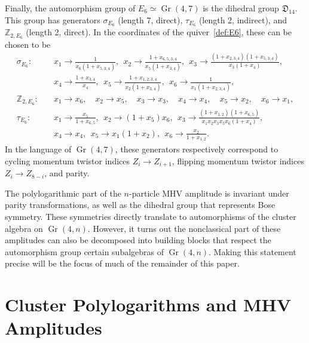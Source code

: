 \documentclass[11pt]{article}
\DeclareMathOperator{\Gr}{Gr}
\begin{document}
Finally, the automorphism group of $E_6 \simeq \Gr(4,7)$ is the dihedral group ${\mathfrak D}_{14}$. This group has generators $\sigma_{E_6}$ (length 7, direct), $\tau_{E_6}$ (length 2, indirect), and $\mathbb{Z}_{2,E_6}$ (length 2, direct). In the coordinates of the quiver~\eqref{def:E6}, these can be chosen to be 
\begin{equation}
\begin{split}
  \sigma_{E_6}:\quad& 
    x_1\to \frac{1}{x_6 (1+x_{5,3,4})},~~
    x_2\to \frac{1+x_{6,5,3,4}}{x_5 (1+x_{3,4})},~~
    x_3\to \frac{(1+x_{2,3,4}) (1+x_{5,3,4})}{x_3 (1+x_4)},\\&
    x_4\to \frac{1+x_{3,4}}{x_4},~~
    x_5\to \frac{1+x_{1,2,3,4}}{x_2 (1+x_{3,4})},~~
    x_6\to \frac{1}{x_1 (1+x_{2,3,4})},\\[2ex]
  \mathbb{Z}_{2,E_6}:\quad& 
    x_1\to x_6, \quad x_2\to x_5, \quad x_3 \to x_3, \quad x_4 \to x_4, \quad x_5\to x_2, \quad x_6\to x_1, \\[2ex]
  \tau_{E_6}:\quad& 
    x_1\to \frac{x_5}{1+x_{6,5}},~~
    x_2\to (1+x_5) x_6,~~
    x_3\to \frac{(1+x_{1,2}) (1+x_{6,5})}{x_1 x_2 x_3 x_5 x_6 (1+x_4)},\\&
    x_4\to x_4,~~
    x_5\to x_1 (1+x_2),~~
    x_6\to \frac{x_2}{1+x_{1,2}}.
\end{split}  
\end{equation}
In the language of $\Gr(4,7)$, these generators respectively correspond to cycling momentum twistor indices $Z_i \to Z_{i+1}$, flipping momentum twistor indices $Z_i \to Z_{8-i}$, and parity. 

The polylogarithmic part of the $n$-particle MHV amplitude is invariant under parity transformations, as well as the dihedral group that represents Bose symmetry. These symmetries directly translate to automorphisms of the cluster algebra on $\Gr(4,n)$. However, it turns out the nonclassical part of these amplitudes can also be decomposed into building blocks that respect the automorphism group certain subalgebras of $\Gr(4,n)$. Making this statement precise will be the focus of much of the remainder of this paper. 

\section{Cluster Polylogarithms and MHV Amplitudes} \label{sec:cluster_polylog_MHV_review}
\end{document}
